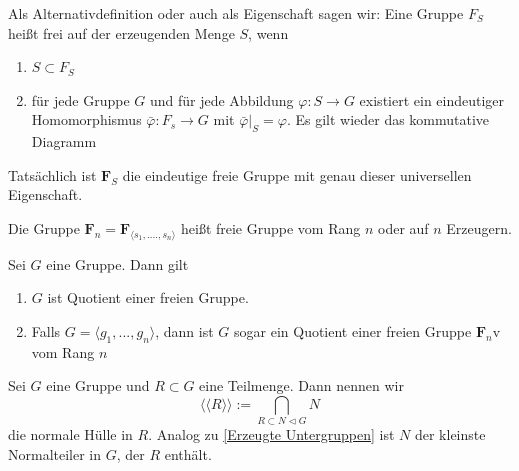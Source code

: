 \documentclass[11pt, a4paper]{article}
\begin{document}
\begin{lemma} Als Alternativdefinition oder auch als Eigenschaft sagen wir: Eine Gruppe $F_S$ heißt frei auf der erzeugenden Menge $S$, wenn 
\begin{enumerate}[label=\roman*)]
    \item $S\subset F_S$
    \item für jede Gruppe $G$ und für jede Abbildung $\varphi: S\to G$ existiert ein eindeutiger Homomorphismus $\bar \varphi: F_s\to G $ mit $\bar \varphi | _S = \varphi$. Es gilt wieder das kommutative Diagramm
\end{enumerate}

\begin{figure}[h]
        \centering
    \end{figure}
    Tatsächlich ist $\mathbf{F}_S$ die eindeutige freie Gruppe mit genau dieser universellen Eigenschaft.
\end{lemma}

\begin{definition} Die Gruppe $\mathbf{F}_n= \mathbf F_{\langle s_1, ...., s_n\rangle}$ heißt freie Gruppe vom Rang $n$ oder auf $n$ Erzeugern.    
\end{definition}

\begin{lemma} Sei $G$ eine Gruppe. Dann gilt
\begin{enumerate}
    \item $G$ ist Quotient einer freien Gruppe.
    \item Falls $G=\langle g_1, ..., g_n\rangle$, dann ist $G$ sogar ein Quotient einer freien Gruppe $\mathbf{F}_n$v vom Rang $n$
\end{enumerate}
    
\end{lemma}

\begin{definition} Sei $G$ eine Gruppe und $R\subset G$ eine Teilmenge. Dann nennen wir 
$$\langle\!\langle R \rangle\!\rangle := \bigcap_{R\subset N \triangleleft G} N$$
die normale Hülle in $R$. Analog zu \ref{Erzeugte Untergruppen} ist $N$ der kleinste Normalteiler in $G$, der $R$ enthält.
    
\end{definition}
\end{document}
